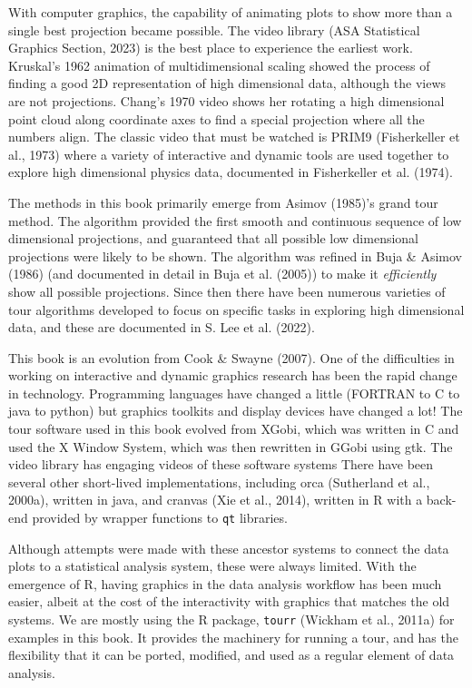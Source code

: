 \documentclass[
  letterpaper,
]{krantz}
\begin{document}
With computer graphics, the capability of animating plots to show more
than a single best projection became possible. The video library (ASA
Statistical Graphics Section, 2023) is the best place to experience the
earliest work. Kruskal's 1962 animation of multidimensional scaling
showed the process of finding a good 2D representation of high
dimensional data, although the views are not projections. Chang's 1970
video shows her rotating a high dimensional point cloud along coordinate
axes to find a special projection where all the numbers align. The
classic video that must be watched is PRIM9 (Fisherkeller et al., 1973)
where a variety of interactive and dynamic tools are used together to
explore high dimensional physics data, documented in Fisherkeller et al.
(1974).

The methods in this book primarily emerge from Asimov (1985)'s grand
tour method. The algorithm provided the first smooth and continuous
sequence of low dimensional projections, and guaranteed that all
possible low dimensional projections were likely to be shown. The
algorithm was refined in Buja \& Asimov (1986) (and documented in detail
in Buja et al. (2005)) to make it \emph{efficiently} show all possible
projections. Since then there have been numerous varieties of tour
algorithms developed to focus on specific tasks in exploring high
dimensional data, and these are documented in S. Lee et al. (2022).

This book is an evolution from Cook \& Swayne (2007). One of the
difficulties in working on interactive and dynamic graphics research has
been the rapid change in technology. Programming languages have changed
a little (FORTRAN to C to java to python) but graphics toolkits and
display devices have changed a lot! The tour software used in this book
evolved from XGobi, which was written in C and used the X Window System,
which was then rewritten in GGobi using gtk. The video library has
engaging videos of these software systems There have been several other
short-lived implementations, including orca (Sutherland et al., 2000a),
written in java, and cranvas (Xie et al., 2014), written in R with a
back-end provided by wrapper functions to \texttt{qt} libraries.

Although attempts were made with these ancestor systems to connect the
data plots to a statistical analysis system, these were always limited.
With the emergence of R, having graphics in the data analysis workflow
has been much easier, albeit at the cost of the interactivity with
graphics that matches the old systems. We are mostly using the R
package, \texttt{tourr} (Wickham et al., 2011a) for examples in this
book. It provides the machinery for running a tour, and has the
flexibility that it can be ported, modified, and used as a regular
element of data analysis.
\end{document}
